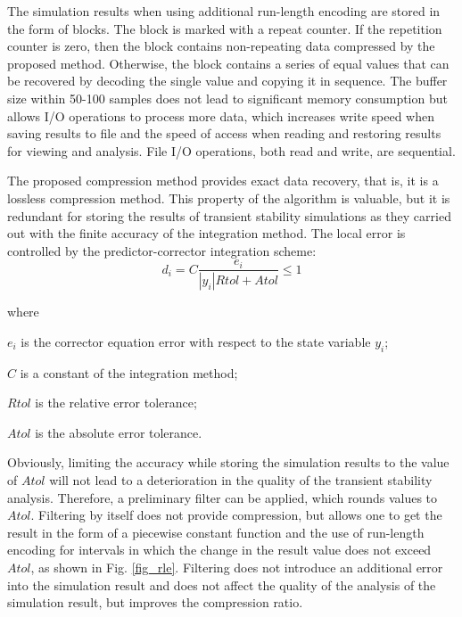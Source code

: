 \documentclass[conference]{IEEEtran}
\begin{document}
The simulation results when using additional run-length encoding are stored in the form of blocks. 
The block is marked with a repeat counter. If the repetition counter is zero, then the block contains non-repeating 
data compressed by the proposed method. Otherwise, the block contains a series of equal values that can be recovered 
by decoding the single value and copying it in sequence. The buffer size within 50-100 samples does not lead to significant memory consumption but allows I/O operations to process more data, which increases write speed when saving results to file
and the speed of access when reading and restoring results for viewing and analysis. 
File I/O operations, both read and write, are sequential.

The proposed compression method provides exact data recovery, that is, it is a lossless compression method. 
This property of the algorithm is valuable, but it is redundant for storing the results of 
transient stability simulations as they carried out with the finite accuracy of the integration method. 
The local error is controlled by the predictor-corrector integration scheme:
\begin{equation}
	\label{eqn_interror}
	d_i=C\frac{e_i}{|y_i|Rtol+Atol} \leq 1
\end{equation}

\noindent where
\begin{description}
	\item  \(e_i\) is the corrector equation error with respect to the 
	state variable \(y_i\);
	\item  \(C\) is a constant of the integration method;
	\item  \(Rtol\) is the relative error tolerance;
	\item  \(Atol\) is the absolute error tolerance.
\end{description}

Obviously, limiting the accuracy while storing the simulation results 
to the value of \(Atol\) will not lead to a deterioration in the quality of the transient stability analysis. 
Therefore, a preliminary filter can be applied, which rounds values to \(Atol\). 
Filtering by itself does not provide compression, but allows one to get the result in the form of a piecewise
constant function and the use of run-length encoding for intervals in which the change in the result value does not exceed \(Atol\), as shown in Fig. \ref{fig_rle}. 
Filtering does not introduce an additional error into the simulation 
result and does not affect the quality of the analysis of the simulation result, but improves the compression ratio.
\end{document}

